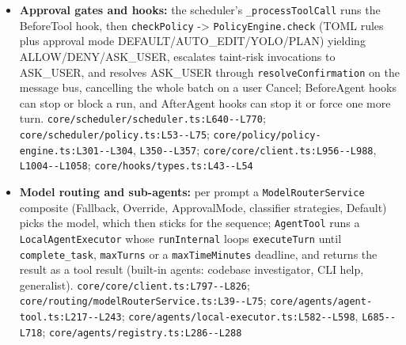 \begin{itemize}
\item \textbf{Approval gates and hooks:} the scheduler's \texttt{\_\allowbreak{}processToolCall} runs the BeforeTool hook, then \texttt{checkPolicy} -> \texttt{PolicyEngine.\allowbreak{}check} (TOML rules plus approval mode DEFAULT/AUTO\_EDIT/YOLO/PLAN) yielding ALLOW/DENY/ASK\_USER, escalates taint-risk invocations to ASK\_USER, and resolves ASK\_USER through \texttt{resolveConfirmation} on the message bus, cancelling the whole batch on a user Cancel; BeforeAgent hooks can stop or block a run, and AfterAgent hooks can stop it or force one more turn. \texttt{core/\allowbreak{}scheduler/\allowbreak{}scheduler.\allowbreak{}ts:\allowbreak{}L640-\allowbreak{}-\allowbreak{}L770}; \texttt{core/\allowbreak{}scheduler/\allowbreak{}policy.\allowbreak{}ts:\allowbreak{}L53-\allowbreak{}-\allowbreak{}L75}; \texttt{core/\allowbreak{}policy/\allowbreak{}policy-\allowbreak{}engine.\allowbreak{}ts:\allowbreak{}L301-\allowbreak{}-\allowbreak{}L304}, \texttt{L350-\allowbreak{}-\allowbreak{}L357}; \texttt{core/\allowbreak{}core/\allowbreak{}client.\allowbreak{}ts:\allowbreak{}L956-\allowbreak{}-\allowbreak{}L988}, \texttt{L1004-\allowbreak{}-\allowbreak{}L1058}; \texttt{core/\allowbreak{}hooks/\allowbreak{}types.\allowbreak{}ts:\allowbreak{}L43-\allowbreak{}-\allowbreak{}L54}
\item \textbf{Model routing and sub-agents:} per prompt a \texttt{ModelRouterService} composite (Fallback, Override, ApprovalMode, classifier strategies, Default) picks the model, which then sticks for the sequence; \texttt{AgentTool} runs a \texttt{LocalAgentExecutor} whose \texttt{runInternal} loops \texttt{executeTurn} until \texttt{complete\_\allowbreak{}task}, \texttt{maxTurns} or a \texttt{maxTimeMinutes} deadline, and returns the result as a tool result (built-in agents: codebase investigator, CLI help, generalist). \texttt{core/\allowbreak{}core/\allowbreak{}client.\allowbreak{}ts:\allowbreak{}L797-\allowbreak{}-\allowbreak{}L826}; \texttt{core/\allowbreak{}routing/\allowbreak{}modelRouterService.\allowbreak{}ts:\allowbreak{}L39-\allowbreak{}-\allowbreak{}L75}; \texttt{core/\allowbreak{}agents/\allowbreak{}agent-\allowbreak{}tool.\allowbreak{}ts:\allowbreak{}L217-\allowbreak{}-\allowbreak{}L243}; \texttt{core/\allowbreak{}agents/\allowbreak{}local-\allowbreak{}executor.\allowbreak{}ts:\allowbreak{}L582-\allowbreak{}-\allowbreak{}L598}, \texttt{L685-\allowbreak{}-\allowbreak{}L718}; \texttt{core/\allowbreak{}agents/\allowbreak{}registry.\allowbreak{}ts:\allowbreak{}L286-\allowbreak{}-\allowbreak{}L288}
\end{itemize}

